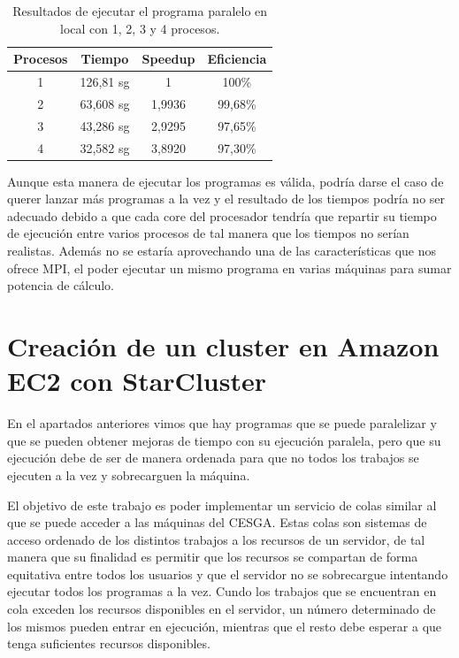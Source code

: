 \documentclass{article}
\begin{document}
\begin{table}[h]
	\begin{center}
		\caption{Resultados de ejecutar el programa paralelo en local con 1, 2, 3 y 4 procesos.}
		\begin{tabular}{|c|c|c|c|}
\hline
\textbf{Procesos} &
\textbf{Tiempo} &
\textbf{Speedup} &
\textbf{Eficiencia} \\ \hline
\hline
1 & 126,81 sg & 1          & 100\% \\ \hline
2 & 63,608 sg & 1,9936 & 99,68\% \\ \hline
3 & 43,286 sg & 2,9295 & 97,65\% \\ \hline
4 & 32,582 sg & 3,8920 & 97,30\% \\ \hline
		\end{tabular}
		\label{tab:resultadosLocal}
	\end{center}
\end{table}

	Aunque esta manera de ejecutar los programas es válida, podría darse el caso de querer lanzar más programas a la vez y el resultado de los tiempos podría no ser adecuado debido a que cada core del procesador tendría que repartir su tiempo de ejecución entre varios procesos de tal manera que los tiempos no serían realistas. Además no se estaría aprovechando una de las características que nos ofrece MPI, el poder ejecutar un mismo programa en varias máquinas para sumar potencia de cálculo.


\clearpage
\section{Creación de un cluster en Amazon EC2 con StarCluster}
	En el apartados anteriores vimos que hay programas que se puede paralelizar y que se pueden obtener mejoras de tiempo con su ejecución paralela, pero que su ejecución debe de ser de manera ordenada para que no todos los trabajos se ejecuten a la vez y sobrecarguen la máquina.

	El objetivo de este trabajo es poder implementar un servicio de colas similar al que se puede acceder a las máquinas del CESGA. Estas colas son  sistemas de acceso ordenado de los distintos trabajos a los recursos de un servidor, de tal manera que su finalidad es permitir que los recursos se compartan de forma equitativa entre todos los usuarios y que el servidor no se sobrecargue intentando ejecutar todos los programas a la vez. Cundo los trabajos que se encuentran en cola exceden los recursos disponibles en el servidor, un número determinado de los mismos pueden entrar en ejecución, mientras que el resto debe esperar a que tenga suficientes recursos disponibles.
\end{document}
